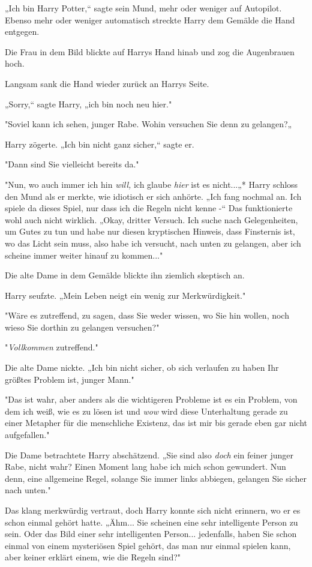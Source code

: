 {„Ich bin Harry Potter,“ sagte sein Mund, mehr oder weniger auf Autopilot. Ebenso mehr oder weniger automatisch streckte Harry dem Gemälde die Hand entgegen.

Die Frau in dem Bild blickte auf Harrys Hand hinab und zog die Augenbrauen hoch.

Langsam sank die Hand wieder zurück an Harrys Seite.

„Sorry,“ sagte Harry, „ich bin noch neu hier."

"Soviel kann ich sehen, junger Rabe. Wohin versuchen Sie denn zu gelangen?„

Harry zögerte. „Ich bin nicht ganz sicher,“ sagte er.

"Dann sind Sie vielleicht bereits da."

"Nun, wo auch immer ich hin \emph{will,} ich glaube \emph{hier} ist es nicht...„* Harry schloss den Mund als er merkte, wie idiotisch er sich anhörte. „Ich fang nochmal an. Ich spiele da dieses Spiel, nur dass ich die Regeln nicht kenne -“ Das funktionierte wohl auch nicht wirklich. „Okay, dritter Versuch. Ich suche nach Gelegenheiten, um Gutes zu tun und habe nur diesen kryptischen Hinweis, dass Finsternis ist, wo das Licht sein muss, also habe ich versucht, nach unten zu gelangen, aber ich scheine immer weiter hinauf zu kommen..."

Die alte Dame in dem Gemälde blickte ihn ziemlich skeptisch an.

Harry seufzte. „Mein Leben neigt ein wenig zur Merkwürdigkeit."

"Wäre es zutreffend, zu sagen, dass Sie weder wissen, wo Sie hin wollen, noch wieso Sie dorthin zu gelangen versuchen?"

"\emph{Vollkommen} zutreffend."

Die alte Dame nickte. „Ich bin nicht sicher, ob sich verlaufen zu haben Ihr größtes Problem ist, junger Mann."

"Das ist wahr, aber anders als die wichtigeren Probleme ist es ein Problem, von dem ich weiß, wie es zu lösen ist und \emph{wow} wird diese Unterhaltung gerade zu einer Metapher für die menschliche Existenz, das ist mir bis gerade eben gar nicht aufgefallen."

Die Dame betrachtete Harry abschätzend. „Sie sind also \emph{doch} ein feiner junger Rabe, nicht wahr? Einen Moment lang habe ich mich schon gewundert. Nun denn, eine allgemeine Regel, solange Sie immer links abbiegen, gelangen Sie sicher nach unten."

Das klang merkwürdig vertraut, doch Harry konnte sich nicht erinnern, wo er es schon einmal gehört hatte. „Ähm... Sie scheinen eine sehr intelligente Person zu sein. Oder das Bild einer sehr intelligenten Person... jedenfalls, haben Sie schon einmal von einem mysteriösen Spiel gehört, das man nur einmal spielen kann, aber keiner erklärt einem, wie die Regeln sind?"

}
